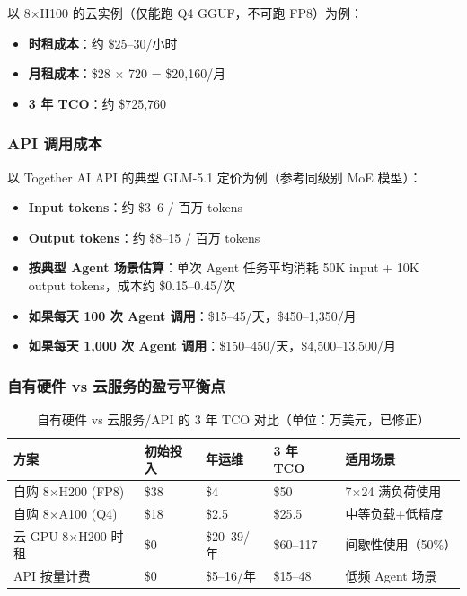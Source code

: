 \documentclass[UTF8,a4paper,10pt,oneside]{ctexart}
\begin{document}
以 8$\times$H100 的云实例（仅能跑 Q4 GGUF，不可跑 FP8）为例：

\begin{itemize}
    \item \textbf{时租成本}：约 \$25--30/小时
    \item \textbf{月租成本}：\$28 $\times$ 720 = \$20,160/月
    \item \textbf{3 年 TCO}：约 \$725,760
\end{itemize}

\subsubsection{API 调用成本}

以 Together AI API 的典型 GLM-5.1 定价为例（参考同级别 MoE 模型）：

\begin{itemize}
    \item \textbf{Input tokens}：约 \$3--6 / 百万 tokens
    \item \textbf{Output tokens}：约 \$8--15 / 百万 tokens
    \item \textbf{按典型 Agent 场景估算}：单次 Agent 任务平均消耗 50K input + 10K output tokens，成本约 \$0.15--0.45/次
    \item \textbf{如果每天 100 次 Agent 调用}：\$15--45/天，\$450--1,350/月
    \item \textbf{如果每天 1,000 次 Agent 调用}：\$150--450/天，\$4,500--13,500/月
\end{itemize}

\subsubsection{自有硬件 vs 云服务的盈亏平衡点}

\begin{table}[htbp]
\centering
\caption{自有硬件 vs 云服务/API 的 3 年 TCO 对比（单位：万美元，已修正）}
\begin{tabular}{p{3.5cm}p{2cm}p{2cm}p{2cm}p{2.5cm}}
\hline
\textbf{方案} & \textbf{初始投入} & \textbf{年运维} & \textbf{3 年 TCO} & \textbf{适用场景} \\
\hline
自购 8$\times$H200 (FP8) & \$38 & \$4 & \$50 & 7$\times$24 满负荷使用 \\
自购 8$\times$A100 (Q4) & \$18 & \$2.5 & \$25.5 & 中等负载+低精度 \\
云 GPU 8$\times$H200 时租 & \$0 & \$20--39/年 & \$60--117 & 间歇性使用（50\%）\\
API 按量计费 & \$0 & \$5--16/年 & \$15--48 & 低频 Agent 场景 \\
\hline
\end{tabular}
\end{table}
\end{document}
